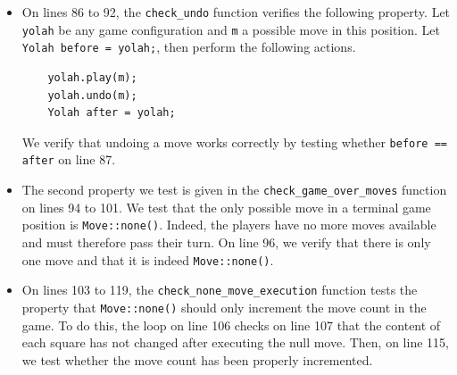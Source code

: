 \documentclass[12pt,a4paper,twoside,openright]{book}
\begin{document}
\begin{itemize}
\item On lines 86 to 92, the \texttt{check_undo} function verifies the following property.
Let \texttt{yolah} be any game configuration and \texttt{m} a possible move in this position. Let \texttt{Yolah before = yolah;}, then perform the following actions.
\begin{verbatim}
    yolah.play(m);
    yolah.undo(m);
    Yolah after = yolah;
\end{verbatim}
We verify that undoing a move works correctly by testing whether \texttt{before == after} on line 87.

\item The second property we test is given in the \texttt{check_game_over_moves} function on lines 94 to 101. We test that the only possible move in a terminal game position is \texttt{Move::none()}. Indeed, the players have no more moves available and must therefore pass their turn. On line 96, we verify that there is only one move and that it is indeed \texttt{Move::none()}.

\item On lines 103 to 119, the \texttt{check_none_move_execution} function tests the property that \texttt{Move::none()} should only increment the move count in the game. To do this, the loop on line 106 checks on line 107 that the content of each square has not changed after executing the null move. Then, on line 115, we test whether the move count has been properly incremented.


\end{itemize}
\end{document}
